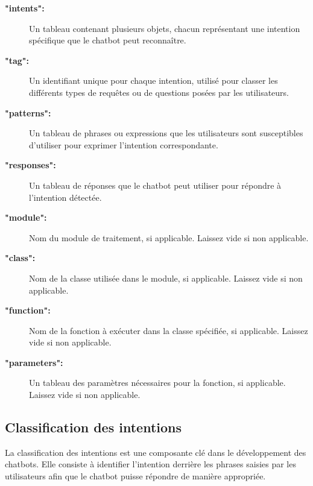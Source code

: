 \documentclass{rapport}
\begin{document}
\begin{minipage}{0.68\textwidth}
    \begin{description}
\item[\textbf{"intents":}] Un tableau contenant plusieurs objets, chacun représentant une intention spécifique que le chatbot peut reconnaître.
  \item[\textbf{"tag":}] Un identifiant unique pour chaque intention, utilisé pour classer les différents types de requêtes ou de questions posées par les utilisateurs.
  \item[\textbf{"patterns":}] Un tableau de phrases ou expressions que les utilisateurs sont susceptibles d'utiliser pour exprimer l'intention correspondante.
  \item[\textbf{"responses":}] Un tableau de réponses que le chatbot peut utiliser pour répondre à l'intention détectée.
  \item[\textbf{"module":}] Nom du module de traitement, si applicable. Laissez vide si non applicable.
  \item[\textbf{"class":}] Nom de la classe utilisée dans le module, si applicable. Laissez vide si non applicable.
  \item[\textbf{"function":}] Nom de la fonction à exécuter dans la classe spécifiée, si applicable. Laissez vide si non applicable.
  \item[\textbf{"parameters":}] Un tableau des paramètres nécessaires pour la fonction, si applicable. Laissez vide si non applicable.
\end{description}
\end{minipage}
\newpage
\subsection{Classification des intentions}
La classification des intentions est une composante clé dans le développement des chatbots. Elle consiste à identifier l'intention derrière les phrases saisies par les utilisateurs afin que le chatbot puisse répondre de manière appropriée.
\end{document}

